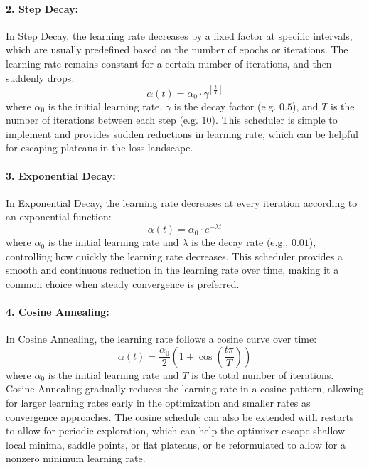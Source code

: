 \documentclass{article}
\begin{document}
\paragraph{2. Step Decay:}
In Step Decay, the learning rate decreases by a fixed factor at specific intervals, which are usually predefined based on the number of epochs or iterations. The learning rate remains constant for a certain number of iterations, and then suddenly drops:
\[
\alpha(t) = \alpha_0 \cdot \gamma^{\left\lfloor \frac{t}{T} \right\rfloor}
\]
where \( \alpha_0 \) is the initial learning rate, \( \gamma \) is the decay factor (e.g. $0.5$), and \( T \) is the number of iterations between each step (e.g. $10$). This scheduler is simple to implement and provides sudden reductions in learning rate, which can be helpful for escaping plateaus in the loss landscape.

\paragraph{3. Exponential Decay:}
In Exponential Decay, the learning rate decreases at every iteration according to an exponential function:
\[
\alpha(t) = \alpha_0 \cdot e^{-\lambda t}
\]
where \( \alpha_0 \) is the initial learning rate and \( \lambda \) is the decay rate (e.g., \( 0.01 \)), controlling how quickly the learning rate decreases. This scheduler provides a smooth and continuous reduction in the learning rate over time, making it a common choice when steady convergence is preferred.

\paragraph{4. Cosine Annealing:}
In Cosine Annealing, the learning rate follows a cosine curve over time:
\[
\alpha(t) = \frac{\alpha_0}{2} \left(1 + \cos\left(\frac{t \pi}{T}\right)\right)
\]
where \( \alpha_0 \) is the initial learning rate and \( T \) is the total number of iterations. Cosine Annealing gradually reduces the learning rate in a cosine pattern, allowing for larger learning rates early in the optimization and smaller rates as convergence approaches. The cosine schedule can also be extended with restarts to allow for periodic exploration, which can help the optimizer escape shallow local minima, saddle points, or flat plateaus, or be reformulated to allow for a nonzero minimum learning rate.

\end{document}
